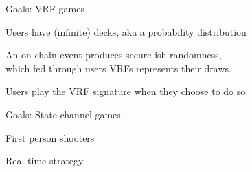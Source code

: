 \documentclass{beamer}
\begin{document}
\begin{frame}{Goals: VRF games}

Users have (infinite) decks, aka a probability distribution \\ \medskip

An on-chain event produces secure-ish randomness, \\
\hspace{5pt} which fed through users VRFs represents their draws.

Users play the VRF signature when they choose to do so \\ \bigskip

\end{frame}


\begin{frame}{Goals: State-channel games}

First person shooters \\ \bigskip\bigskip

Real-time strategy \\ \bigskip\bigskip

\end{frame}
\end{document}
